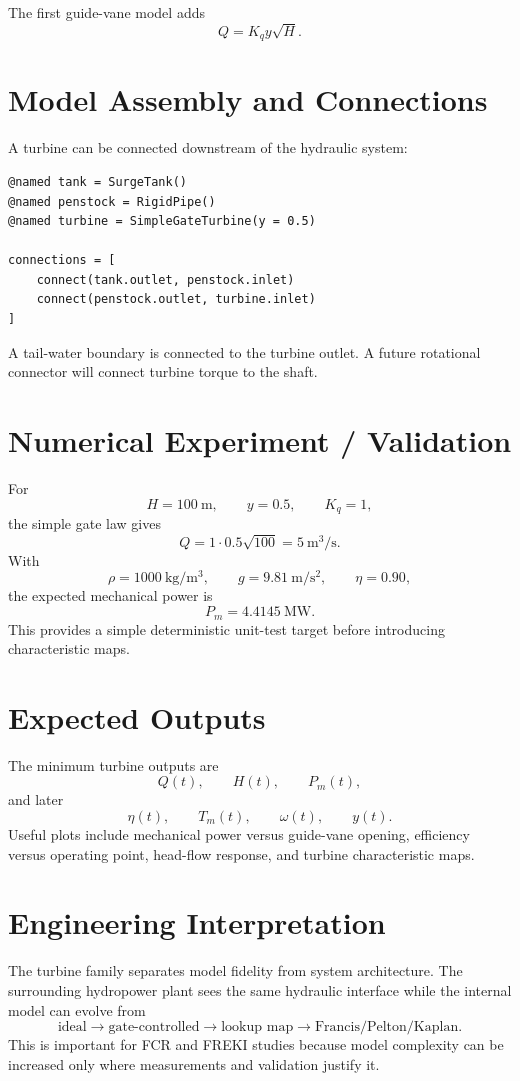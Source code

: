 \documentclass[11pt,a4paper]{article}
\begin{document}
The first guide-vane model adds
\[
Q=K_q y\sqrt{H}.
\]

\section{Model Assembly and Connections}
A turbine can be connected downstream of the hydraulic system:
\begin{lstlisting}
@named tank = SurgeTank()
@named penstock = RigidPipe()
@named turbine = SimpleGateTurbine(y = 0.5)

connections = [
    connect(tank.outlet, penstock.inlet)
    connect(penstock.outlet, turbine.inlet)
]
\end{lstlisting}
A tail-water boundary is connected to the turbine outlet. A future rotational connector will connect turbine torque to the shaft.

\section{Numerical Experiment / Validation}
For
\[
H=100~\si{\meter},\qquad y=0.5,\qquad K_q=1,
\]
the simple gate law gives
\[
Q=1\cdot0.5\sqrt{100}=5~\si{\meter\cubed\per\second}.
\]
With
\[
\rho=1000~\si{\kilogram\per\meter\cubed},\qquad
g=9.81~\si{\meter\per\second\squared},\qquad
\eta=0.90,
\]
the expected mechanical power is
\[
\boxed{P_m=4.4145~\si{\mega\watt}}.
\]
This provides a simple deterministic unit-test target before introducing characteristic maps.

\section{Expected Outputs}
The minimum turbine outputs are
\[
Q(t),\qquad H(t),\qquad P_m(t),
\]
and later
\[
\eta(t),\qquad T_m(t),\qquad \omega(t),\qquad y(t).
\]
Useful plots include mechanical power versus guide-vane opening, efficiency versus operating point, head-flow response, and turbine characteristic maps.

\section{Engineering Interpretation}
The turbine family separates model fidelity from system architecture. The surrounding hydropower plant sees the same hydraulic interface while the internal model can evolve from
\[
\boxed{\text{ideal}\rightarrow\text{gate-controlled}\rightarrow\text{lookup map}\rightarrow\text{Francis/Pelton/Kaplan}}.
\]
This is important for FCR and FREKI studies because model complexity can be increased only where measurements and validation justify it.
\end{document}

